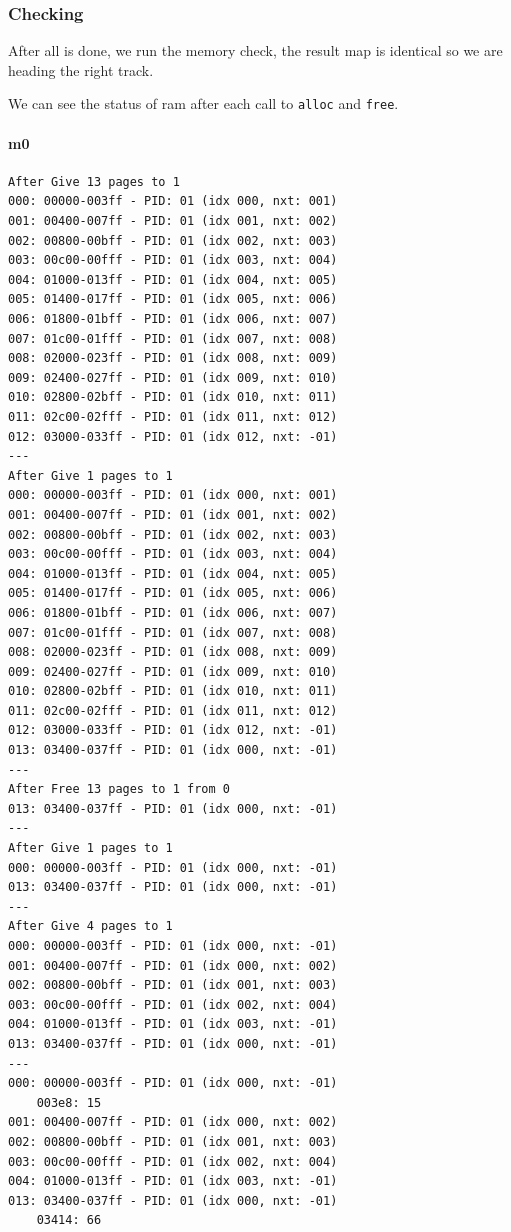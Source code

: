 \documentclass[]{article}
\let\oldparagraph\paragraph
\renewcommand{\paragraph}[1]{\oldparagraph{#1}\mbox{}}
\begin{document}
\subsubsection{Checking}\label{checking}

After all is done, we run the memory check, the result map is identical
so we are heading the right track.

We can see the status of ram after each call to \texttt{alloc} and
\texttt{free}.

\paragraph{m0}\label{m0}

\begin{verbatim}
After Give 13 pages to 1
000: 00000-003ff - PID: 01 (idx 000, nxt: 001)
001: 00400-007ff - PID: 01 (idx 001, nxt: 002)
002: 00800-00bff - PID: 01 (idx 002, nxt: 003)
003: 00c00-00fff - PID: 01 (idx 003, nxt: 004)
004: 01000-013ff - PID: 01 (idx 004, nxt: 005)
005: 01400-017ff - PID: 01 (idx 005, nxt: 006)
006: 01800-01bff - PID: 01 (idx 006, nxt: 007)
007: 01c00-01fff - PID: 01 (idx 007, nxt: 008)
008: 02000-023ff - PID: 01 (idx 008, nxt: 009)
009: 02400-027ff - PID: 01 (idx 009, nxt: 010)
010: 02800-02bff - PID: 01 (idx 010, nxt: 011)
011: 02c00-02fff - PID: 01 (idx 011, nxt: 012)
012: 03000-033ff - PID: 01 (idx 012, nxt: -01)
---
After Give 1 pages to 1
000: 00000-003ff - PID: 01 (idx 000, nxt: 001)
001: 00400-007ff - PID: 01 (idx 001, nxt: 002)
002: 00800-00bff - PID: 01 (idx 002, nxt: 003)
003: 00c00-00fff - PID: 01 (idx 003, nxt: 004)
004: 01000-013ff - PID: 01 (idx 004, nxt: 005)
005: 01400-017ff - PID: 01 (idx 005, nxt: 006)
006: 01800-01bff - PID: 01 (idx 006, nxt: 007)
007: 01c00-01fff - PID: 01 (idx 007, nxt: 008)
008: 02000-023ff - PID: 01 (idx 008, nxt: 009)
009: 02400-027ff - PID: 01 (idx 009, nxt: 010)
010: 02800-02bff - PID: 01 (idx 010, nxt: 011)
011: 02c00-02fff - PID: 01 (idx 011, nxt: 012)
012: 03000-033ff - PID: 01 (idx 012, nxt: -01)
013: 03400-037ff - PID: 01 (idx 000, nxt: -01)
---
After Free 13 pages to 1 from 0
013: 03400-037ff - PID: 01 (idx 000, nxt: -01)
---
After Give 1 pages to 1
000: 00000-003ff - PID: 01 (idx 000, nxt: -01)
013: 03400-037ff - PID: 01 (idx 000, nxt: -01)
---
After Give 4 pages to 1
000: 00000-003ff - PID: 01 (idx 000, nxt: -01)
001: 00400-007ff - PID: 01 (idx 000, nxt: 002)
002: 00800-00bff - PID: 01 (idx 001, nxt: 003)
003: 00c00-00fff - PID: 01 (idx 002, nxt: 004)
004: 01000-013ff - PID: 01 (idx 003, nxt: -01)
013: 03400-037ff - PID: 01 (idx 000, nxt: -01)
---
000: 00000-003ff - PID: 01 (idx 000, nxt: -01)
	003e8: 15
001: 00400-007ff - PID: 01 (idx 000, nxt: 002)
002: 00800-00bff - PID: 01 (idx 001, nxt: 003)
003: 00c00-00fff - PID: 01 (idx 002, nxt: 004)
004: 01000-013ff - PID: 01 (idx 003, nxt: -01)
013: 03400-037ff - PID: 01 (idx 000, nxt: -01)
	03414: 66

\end{verbatim}
\end{document}
